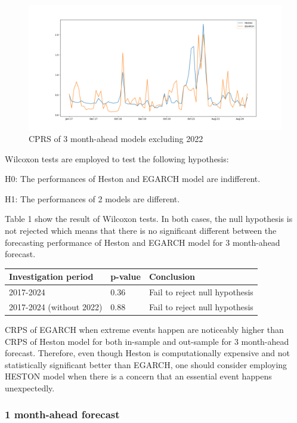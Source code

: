 \documentclass[12pt,a4paper]{article}
\numberwithin{equation}{section}
\begin{document}
\begin{figure}[h!] 
\includegraphics[scale=1,width=1\linewidth,height=0.4\textheight]{m3_without22.png}
\caption{CPRS of 3 month-ahead models excluding 2022}
\label{3Mwithout22}
\end{figure}

Wilcoxon tests are employed to test the following hypothesis:

H0: The performances of Heston and EGARCH model are indifferent.

H1: The performances of 2 models are different.

Table 1 show the result of Wilcoxon tests. In both cases, the null hypothesis is not rejected which means that there is no significant different between the forecasting performance of Heston and EGARCH model for 3 month-ahead forecast.


\begin{table}[h!]
\centering
\begin{tabular}{@{}lll@{}}
\toprule
Investigation period     & p-value & Conclusion                     \\ \midrule
2017-2024                & 0.36    & Fail to reject null hypothesis \\
2017-2024 (without 2022) & 0.88    & Fail to reject null hypothesis \\ \bottomrule
\end{tabular}
\end{table}

CRPS of EGARCH when extreme events happen are noticeably higher than CRPS of Heston model for both in-sample and out-sample for 3 month-ahead forecast. Therefore, even though Heston is computationally expensive and not statistically significant better than EGARCH, one should consider employing HESTON model when there is a concern that an essential event happens unexpectedly. 


\subsubsection{1 month-ahead forecast}
\end{document}
